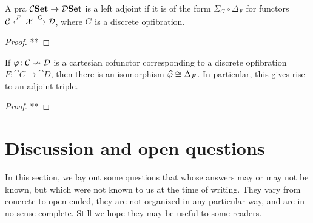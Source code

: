 \documentclass[Book-Poly]{subfiles}
\begin{document}
\begin{proposition}
A pra $\mathcal{C}\textbf{Set}\to\mathcal{D}\textbf{Set}$ is a left adjoint if it is of the form $\Sigma_G\circ\Delta_F$ for functors $\mathcal{C}\xleftarrow{F}\mathcal{X}\xrightarrow{G}\mathcal{D}$, where $G$ is a discrete opfibration.
\end{proposition}
\begin{proof}
**
\end{proof}

\begin{corollary}\label{cor.cartesian_cof_extra_adjoint}
If $\varphi\colon\mathcal{C}\nrightarrow\mathcal{D}$ is a cartesian cofunctor corresponding to a discrete opfibration $F\colon\cat{C}\to\cat{D}$, then there is an isomorphism $\widehat{\varphi}\cong\Delta_F$. In particular, this gives rise to an adjoint triple.
\end{corollary}
\begin{proof}
**
\end{proof}


\section{Discussion and open questions}\label{sec.discussion_open_qs}

In this section, we lay out some questions that whose answers may or may not be known, but which were not known to us at the time of writing. They vary from concrete to open-ended, they are not organized in any particular way, and are in no sense complete. Still we hope they may be useful to some readers.
\end{document}

